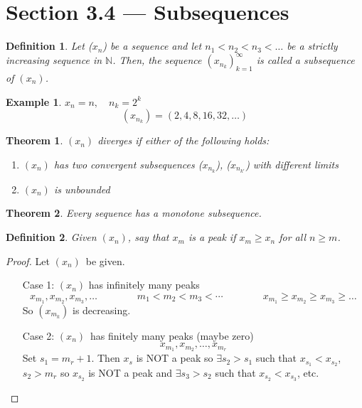\documentclass{report}
\newcommand{\N}{\mathbb{N}}  %
\newcommand{\xn}{(x_n)}
\theoremstyle{mystyle}
\newtheorem*{definition}{Definition}
\newtheorem*{example}{Example}
\theoremstyle{customtheorem}
\newtheorem{customthm}{Theorem}
\newcommand{\dfn}[1]{   \begin{definition}{#1}\end{definition}       }
\begin{document}
    \section*{Section 3.4 --- Subsequences}
    \dfn{Let ($x_n$) be a sequence and let $n_1<n_2<n_3<\ldots$ be a strictly increasing sequence in $\N$. Then, the sequence $(x_{n_k})^\infty_{k=1}$ is called a subsequence of $(x_n)$.}
    \begin{example}
        \( x_n=n, \quad n_k=2^k \)\vspace{-1em}
        \[ (x_{n_k}) = (2, 4, 8, 16, 32, \ldots) \]
    \end{example}

    \begin{customthm}
        $(x_n)$ diverges if either of the following holds:
        \begin{enumerate}
            \item $(x_n)$ has two convergent subsequences ($x_{n_{k}}$), ($x_{n_{k'}}$) with different limits
            \item $(x_n)$ is unbounded
        \end{enumerate}
    \end{customthm}

    \begin{customthm}
        Every sequence has a monotone subsequence.
    \end{customthm}
    \begin{definition}
        Given $\xn$, say that $x_m$ is a \emph{peak} if $x_m \geq x_n$ for all $n\geq m$.
    \end{definition}
    \begin{proof}
        Let $\xn$\ be given.
        \begin{enumerate}
            \item[Case 1:] $\xn$ has infinitely many peaks
            \[ x_{m_1}, x_{m_2}, x_{m_3}, \ldots \qquad\qquad m_1 < m_2 < m_3 < \cdots \qquad\qquad x_{m_1} \geq x_{m_2} \geq x_{m_3} \geq \ldots \]
            So $(x_{m_k})$ is decreasing.
            \item[Case 2:] $\xn$\ has finitely many peaks (maybe zero)
            \[ x_{m_1}, x_{m_2}, \ldots, x_{m_r}\]
            Set $s_1=m_r+1$. Then $x_s$ is NOT a peak so $\exists s_2 > s_1$ such that $x_{s_1} < x_{s_2}$, $s_2 > m_r$ so $x_{s_2}$ is NOT a peak and $\exists s_3 > s_2$ such that $x_{s_2} < x_{s_3}$, etc.
        \end{enumerate}
    \end{proof}
\end{document}
